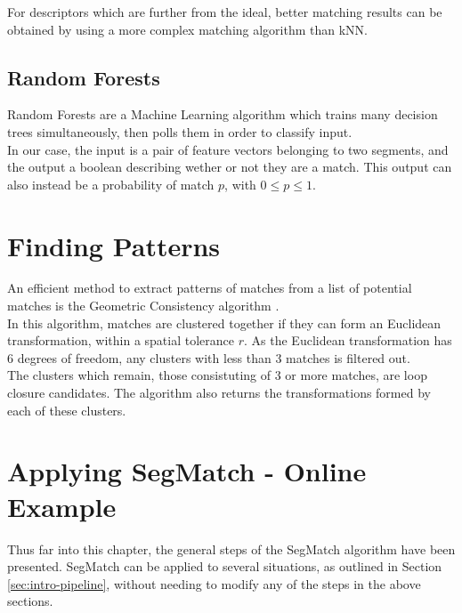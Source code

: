 For descriptors which are further from the ideal, better matching results can be obtained by using a more complex matching algorithm than kNN.

\subsection{Random Forests}
\label{subsec:RF}

Random Forests are a Machine Learning algorithm which trains many decision trees simultaneously, then polls them in order to classify input.\\

In our case, the input is a pair of feature vectors belonging to two segments, and the output a boolean describing wether or not they are a match. This output can also instead be a probability of match $p$, with $0 \leq p \leq 1$.


\section{Finding Patterns}
\label{sec:filtering}

An efficient method to extract patterns of matches from a list of potential matches is the Geometric Consistency algorithm \cite{geometric-consistency}.\\

In this algorithm, matches are clustered together if they can form an Euclidean transformation, within a spatial tolerance $r$. As the Euclidean transformation has 6 degrees of freedom, any clusters with less than 3 matches is filtered out.\\

The clusters which remain, those consistuting of 3 or more matches, are loop closure candidates. The algorithm also returns the transformations formed by each of these clusters.\\

\section{Applying SegMatch - Online Example}
\label{sec:online}

Thus far into this chapter, the general steps of the SegMatch algorithm have been presented. SegMatch can be applied to several situations, as outlined in Section \ref{sec:intro-pipeline}, without needing to modify any of the steps in the above sections.\\

